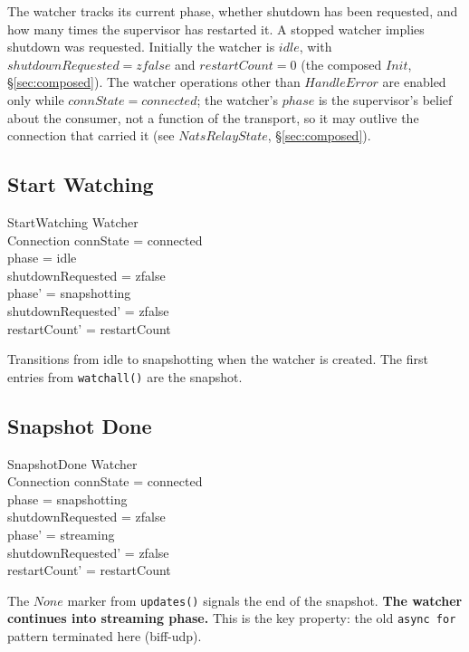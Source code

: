 \documentclass[a4paper,10pt,fleqn]{article}
\begin{document}
The watcher tracks its current phase, whether shutdown has been
requested, and how many times the supervisor has restarted it.
A stopped watcher implies shutdown was requested.  Initially the
watcher is $idle$, with $shutdownRequested = zfalse$ and
$restartCount = 0$ (the composed $Init$,
\S\ref{sec:composed}).  The watcher operations other than
$HandleError$ are enabled only while $connState = connected$; the
watcher's $phase$ is the supervisor's belief about the consumer, not a
function of the transport, so it may outlive the connection that
carried it (see $NatsRelayState$, \S\ref{sec:composed}).

\subsection{Start Watching}

\begin{schema}{StartWatching}
  \Delta Watcher \\
  \Xi Connection
  \where
  connState = connected \\
  phase = idle \\
  shutdownRequested = zfalse \\
  phase' = snapshotting \\
  shutdownRequested' = zfalse \\
  restartCount' = restartCount
\end{schema}

Transitions from idle to snapshotting when the watcher is
created.  The first entries from \texttt{watchall()} are the
snapshot.

\subsection{Snapshot Done}

\begin{schema}{SnapshotDone}
  \Delta Watcher \\
  \Xi Connection
  \where
  connState = connected \\
  phase = snapshotting \\
  shutdownRequested = zfalse \\
  phase' = streaming \\
  shutdownRequested' = zfalse \\
  restartCount' = restartCount
\end{schema}

The $None$ marker from \texttt{updates()} signals the end of
the snapshot.  \textbf{The watcher continues into streaming
phase.}  This is the key property: the old \texttt{async~for}
pattern terminated here (biff-udp).
\end{document}
